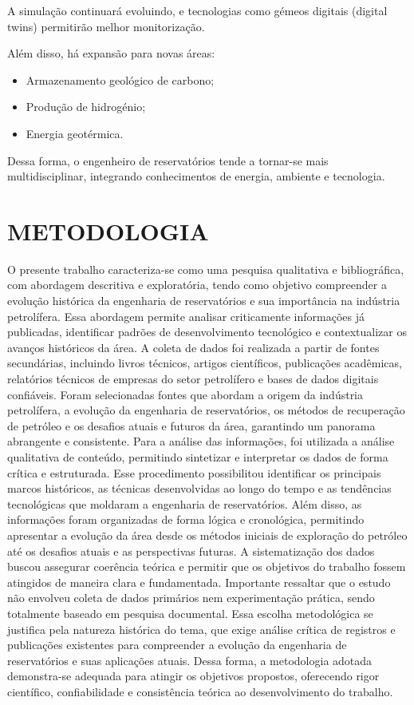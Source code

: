 \documentclass[12pt,a4paper]{report}
\begin{document}
A simulação continuará evoluindo, e tecnologias como gémeos digitais (digital twins) permitirão melhor monitorização.

Além disso, há expansão para novas áreas:
\begin{itemize}
    \item Armazenamento geológico de carbono;
    \item Produção de hidrogénio;
    \item Energia geotérmica.
\end{itemize}

Dessa forma, o engenheiro de reservatórios tende a tornar-se mais multidisciplinar, integrando conhecimentos de energia, ambiente e tecnologia.


\chapter{METODOLOGIA}
O presente trabalho caracteriza-se como uma pesquisa qualitativa e bibliográfica, com abordagem descritiva e exploratória, tendo como objetivo compreender a evolução histórica da engenharia de reservatórios e sua importância na indústria petrolífera. Essa abordagem permite analisar criticamente informações já publicadas, identificar padrões de desenvolvimento tecnológico e contextualizar os avanços históricos da área.
A coleta de dados foi realizada a partir de fontes secundárias, incluindo livros técnicos, artigos científicos, publicações acadêmicas, relatórios técnicos de empresas do setor petrolífero e bases de dados digitais confiáveis. Foram selecionadas fontes que abordam a origem da indústria petrolífera, a evolução da engenharia de reservatórios, os métodos de recuperação de petróleo e os desafios atuais e futuros da área, garantindo um panorama abrangente e consistente.
Para a análise das informações, foi utilizada a análise qualitativa de conteúdo, permitindo sintetizar e interpretar os dados de forma crítica e estruturada. Esse procedimento possibilitou identificar os principais marcos históricos, as técnicas desenvolvidas ao longo do tempo e as tendências tecnológicas que moldaram a engenharia de reservatórios.
Além disso, as informações foram organizadas de forma lógica e cronológica, permitindo apresentar a evolução da área desde os métodos iniciais de exploração do petróleo até os desafios atuais e as perspectivas futuras. A sistematização dos dados buscou assegurar coerência teórica e permitir que os objetivos do trabalho fossem atingidos de maneira clara e fundamentada.
Importante ressaltar que o estudo não envolveu coleta de dados primários nem experimentação prática, sendo totalmente baseado em pesquisa documental. Essa escolha metodológica se justifica pela natureza histórica do tema, que exige análise crítica de registros e publicações existentes para compreender a evolução da engenharia de reservatórios e suas aplicações atuais.
Dessa forma, a metodologia adotada demonstra-se adequada para atingir os objetivos propostos, oferecendo rigor científico, confiabilidade e consistência teórica ao desenvolvimento do trabalho.
\end{document}
